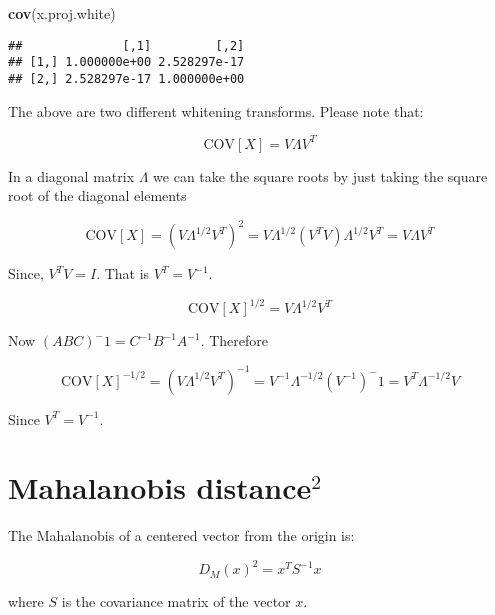 \documentclass[]{article}
\newenvironment{Shaded}{\begin{snugshade}}{\end{snugshade}}
\newcommand{\KeywordTok}[1]{\textcolor[rgb]{0.13,0.29,0.53}{\textbf{{#1}}}}
\newcommand{\NormalTok}[1]{{#1}}
\begin{document}
\begin{Shaded}
\begin{Highlighting}[]
\KeywordTok{cov}\NormalTok{(x.proj.white)}
\end{Highlighting}
\end{Shaded}

\begin{verbatim}
##              [,1]         [,2]
## [1,] 1.000000e+00 2.528297e-17
## [2,] 2.528297e-17 1.000000e+00
\end{verbatim}

The above are two different whitening transforms. Please note that:

\begin{equation}
\text{COV}[X] = V \Lambda V^T
\end{equation}

In a diagonal matrix \(\Lambda\) we can take the square roots by just
taking the square root of the diagonal elements

\begin{equation}
\text{COV}[X] = (V \Lambda^{1/2} V^T)^2 = V \Lambda^{1/2} (V^T V) \Lambda^{1/2} V^T = V \Lambda V^T
\end{equation}

Since, \(V^T V = I\). That is \(V^T = V^{-1}\).

\begin{equation}
\text{COV}[X]^{1/2} = V \Lambda^{1/2} V^T 
\end{equation}

Now \((ABC)^-1 = C^{-1}B^{-1}A^{-1}\). Therefore

\begin{equation}
\text{COV}[X]^{-1/2} = (V \Lambda^{1/2} V^T )^{-1} = V^{-1} \Lambda^{-1/2} (V^{-1})^-1 = V^{T} \Lambda^{-1/2} V
\end{equation}

Since \(V^T = V^{-1}\).

\section{\texorpdfstring{Mahalanobis
distance\(^2\)}{Mahalanobis distance\^{}2}}\label{mahalanobis-distance2}

The Mahalanobis of a centered vector from the origin is:

\begin{equation}
D_{M}(x)^2 = x^T S^{-1} x
\end{equation}

where \(S\) is the covariance matrix of the vector \(x\).
\end{document}
